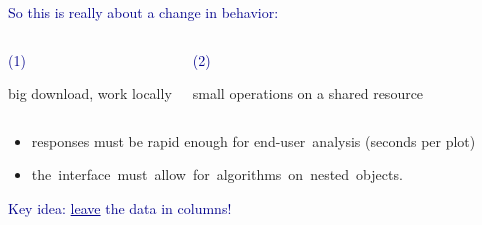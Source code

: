 \documentclass[aspectratio=169]{beamer}
\begin{document}
\begin{frame}{}
\vspace{1 cm}
\Large
\textcolor{darkblue}{So this is really about a change in behavior:}

\vspace{-0.35 cm}
\begin{columns}
\begin{center}
\textcolor{darkblue}{\normalsize (1)}

big download, work locally
\end{center}

\begin{center}
\textcolor{darkblue}{\normalsize (2)}

small operations on a shared resource
\end{center}
\end{columns}

\vspace{0.75 cm}

\vspace{0.5 cm}
\begin{minipage}{0.8\linewidth}
\begin{itemize}\setlength{\itemsep}{0.25 cm}
\item<3-> \Large responses must be rapid enough for \mbox{end-user analysis\hspace{-0.5 cm}} (seconds per plot)
\item<4-> \mbox{\Large the interface must allow for algorithms on nested objects.\hspace{-3 cm}}
\end{itemize}
\end{minipage}
\end{frame}

\begin{frame}{}
\huge
\begin{center}
\textcolor{darkblue}{Key idea: \underline{leave} the data in columns!}
\end{center}
\end{frame}
\end{document}
